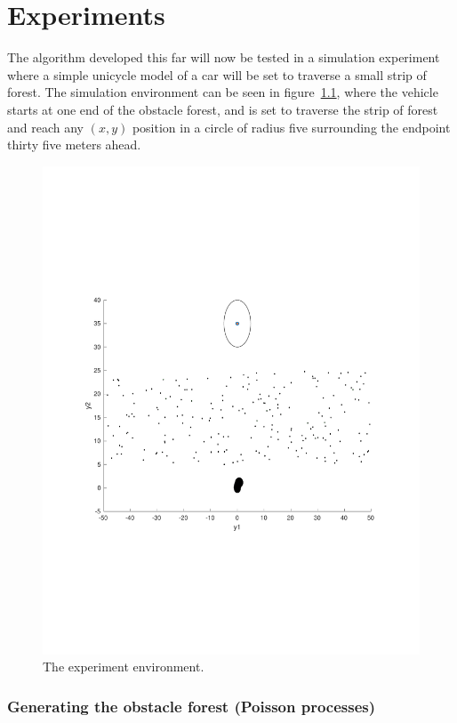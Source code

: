 \chapter{Experiments}

The \rrtfunnel{} algorithm developed this far will now be tested in a simulation
experiment where a simple unicycle model of a car will be set to traverse a
small strip of forest. The simulation environment can be seen in
figure~\cref{fig:simulated-forest}, where the vehicle starts at one end of the
obstacle forest, and is set to traverse the strip of forest and reach any
\((x,y)\) position in a circle of radius five surrounding the endpoint thirty
five meters ahead.

\begin{figure}
  \centering \includegraphics[scale=.5]{figures/experiments/simulated-forest}
  \caption{The experiment environment.}
  \label{fig:simulated-forest}
\end{figure}

\subsection{Generating the obstacle forest (Poisson processes)}
\label{sec:Poisson-Process}

